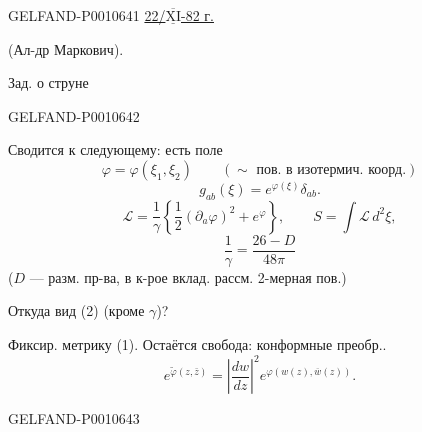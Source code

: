 \begin{GelfandAdjacentEvidence}{GELFAND-P001064}{1}
\underline{22/\(\overline{\underline{\mathrm{XI}}}\)-82 г.}\qquad
{}


(Ал-др Маркович).

Зад. о струне
\end{GelfandAdjacentEvidence}
\begin{GelfandAdjacentEvidence}{GELFAND-P001064}{2}


Сводится к следующему: есть поле
\[
\varphi=\varphi(\xi_1,\xi_2)\qquad
  (\sim\text{ пов. в изотермич. коорд.})
\]
\begin{equation*}
g_{ab}(\xi)=e^{\varphi(\xi)}\delta_{ab}.
\tag{1}
\end{equation*}
\begin{equation*}
\mathcal L=\frac1\gamma\left\{\frac12(\partial_a\varphi)^2+e^\varphi\right\},
\qquad S=\int\mathcal L\,d^2\xi,
\tag{2}
\end{equation*}
\begin{equation*}
\frac1\gamma=\frac{26-D}{48\pi}
\tag{3}
\end{equation*}
(\(D\) — разм. пр-ва, в к-рое вклад. рассм. 2-мерная пов.)

Откуда вид (2) (кроме \(\gamma\))?

Фиксир. метрику (1). Остаётся свобода: конформные преобр..
\begin{equation*}
e^{\widetilde\varphi(z,\bar z)}
=\left|\frac{dw}{dz}\right|^2 e^{\varphi(w(z),\overline w(z))}.
\tag{4}
\end{equation*}
\end{GelfandAdjacentEvidence}
\begin{GelfandAdjacentEvidence}{GELFAND-P001064}{3}

\end{GelfandAdjacentEvidence}
